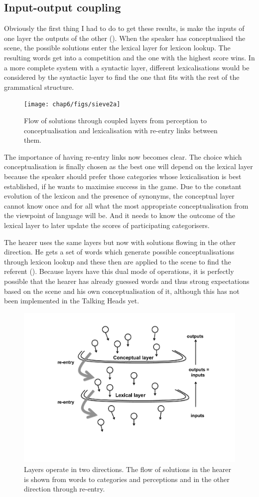 \subsection{Input-output coupling}

Obviously the first thing I had to do to get 
these results, is make the inputs of one layer the
outputs of the other (). When the 
speaker has conceptualised the scene, the possible
solutions enter the lexical layer for lexicon lookup. 
The resulting words get into a competition and the 
one with the highest score wins. In a more complete
system with a syntactic layer, different lexicalisations
would be considered by the syntactic layer to find 
the one that fits with the rest of the grammatical 
structure. 
\begin{figure}[htbp]
  \centerline{\texttt{[image: chap6/figs/sieve2a]}}
\caption{\label{sieve2a} Flow of solutions through 
coupled layers from perception to conceptualisation and lexicalisation with re-entry links between them.} 
\end{figure}

The importance of having re-entry links now becomes
clear. The choice which conceptualisation is finally chosen 
as the best one will depend on the lexical layer because 
the speaker should prefer those categories whose 
lexicalisation is best established, if he wants to 
maximise success in the game. Due to the constant evolution
of the lexicon and the presence of synonyms, the conceptual
layer cannot know once and for all what the most
appropriate conceptualisation from the viewpoint of 
language will be. And it needs to know the outcome of the
lexical layer to later update the scores of participating
categorisers. 

The hearer uses the same layers but now with solutions
flowing in the other direction. He gets a set of words
which generate possible conceptualisations through 
lexicon lookup and these then are applied to the 
scene to find the referent (). Because 
layers have this dual mode of operations, it is perfectly 
possible that the hearer has already guessed words and 
thus strong expectations based on the scene and his 
own conceptualisation of it, although this has not been
implemented in the Talking Heads yet. 
\begin{figure}[htbp]
  \centerline{\includegraphics[width=.65\textwidth]{chap6/figs/sieve2b}}
\caption{\label{sieve2b} Layers operate in two 
directions. The flow of solutions in the hearer is shown from words to categories and perceptions
and in the other direction through re-entry.}
\end{figure}

